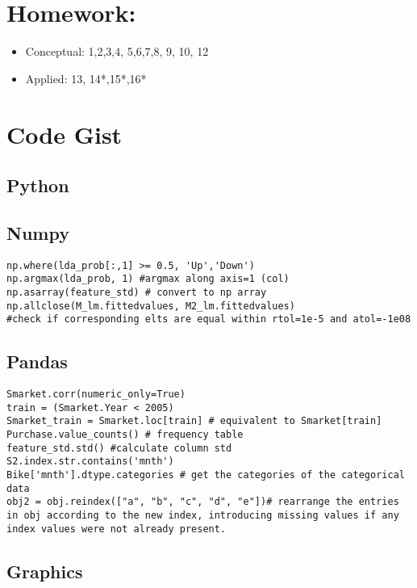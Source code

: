 \documentclass[
  letterpaper,
  DIV=11,
  numbers=noendperiod]{scrreprt}
\providecommand{\tightlist}{%
  \setlength{\itemsep}{0pt}\setlength{\parskip}{0pt}}\usepackage{longtable,booktabs,array}
\begin{document}
\section{Homework:}\label{homework}

\begin{itemize}
\tightlist
\item
  Conceptual: 1,2,3,4, 5,6,7,8, 9, 10, 12
\item
  Applied: 13, 14*,15*,16*
\end{itemize}

\section{Code Gist}\label{code-gist-2}

\subsection{Python}\label{python-2}

\subsection{Numpy}\label{numpy-2}

\begin{verbatim}
np.where(lda_prob[:,1] >= 0.5, 'Up','Down')
np.argmax(lda_prob, 1) #argmax along axis=1 (col)
np.asarray(feature_std) # convert to np array
np.allclose(M_lm.fittedvalues, M2_lm.fittedvalues) 
#check if corresponding elts are equal within rtol=1e-5 and atol=-1e08
\end{verbatim}

\subsection{Pandas}\label{pandas-2}

\begin{verbatim}
Smarket.corr(numeric_only=True)
train = (Smarket.Year < 2005)
Smarket_train = Smarket.loc[train] # equivalent to Smarket[train]
Purchase.value_counts() # frequency table
feature_std.std() #calculate column std
S2.index.str.contains('mnth')
Bike['mnth'].dtype.categories # get the categories of the categorical data
obj2 = obj.reindex(["a", "b", "c", "d", "e"])# rearrange the entries in obj according to the new index, introducing missing values if any index values were not already present. 
\end{verbatim}

\subsection{Graphics}\label{graphics-2}
\end{document}

